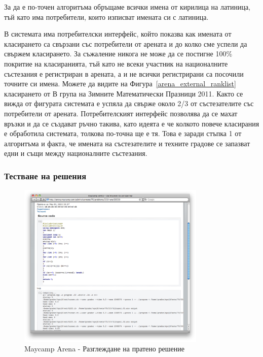 \documentclass[a4paper,12pt]{article}
\begin{document}
  За да е по-точен алгоритъма обръщаме всички имена от кирилица на латиница, тъй като има потребители, които изписват имената си с латиница.
  
  В системата има потребителски интерфейс, който показва как имената от класирането са свързани със потребители от арената и до колко сме успели да свържем класирането. За съжаление никога не може да се постигне 100\% покритие на класиранията, тъй като не всеки участник на националните състезания е регистриран в арената, а и не всички регистрирани са посочили точните си имена. Можете да видите на Фигура~\ref{arena_external_ranklist} класирането от В група на Зимните Математически Празници 2011. Както се вижда от фигурата системата е успяла да свърже около 2/3 от състезателите със потребители от арената. Потребителският интерфейс позволява да се махат връзки и да се създават ръчно такива, като идеята е че колкото повече класирания е обработила системата, толкова по-точна ще е тя. Това е заради стъпка 1 от алгоритъма и факта, че имената на състезателите и техните градове се запазват едни и същи между националните състезания.
  
  \subsubsection{Тестване на решения}

  \begin{figure}[ht]
    \begin{center}
      \includegraphics[width=0.8\textwidth]{maycamp_arena_admin_run.png}
    \end{center}
    \caption{Maycamp Arena - Разглеждане на пратено решение}
    \label{arena_external_run}
  \end{figure}
  
\end{document}
